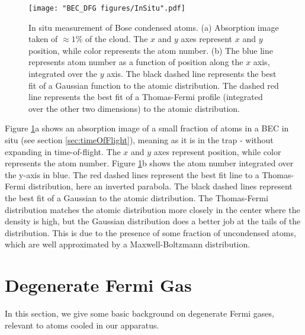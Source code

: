 \begin{figure}
	\texttt{[image: "BEC\_DFG figures/InSitu".pdf]}
\caption[In situ measurement of a fraction of bose condensed atoms]{In situ measurement of Bose condensed atoms. (a) Absorption image taken of $\approx1\%$ of the cloud. The $x$ and $y$ axes represent $x$ and $y$ position, while color represents the atom number. (b) The blue line represents atom number as a function of position along the $x$ axis, integrated over the $y$ axis. The black dashed line represents the best fit of a Gaussian function to the atomic distribution. The dashed red line represents the best fit of a Thomas-Fermi profile (integrated over the other two dimensions) to the atomic distribution.}
\label{fig:InSitu}
\end{figure}

Figure \ref{fig:InSitu}a shows an absorption image of a small fraction of atoms in a BEC in situ (see section \ref{sec:timeOfFlight}), meaning as it is in the trap - without expanding in time-of-flight. The $x$ and $y$ axes represent position, while color represents the atom number. Figure \ref{fig:InSitu}b shows the atom number integrated over the y-axis in blue. The red dashed lines represent the best fit line to a Thomas-Fermi distribution, here an inverted parabola. The black dashed lines represent the best fit of a Gaussian to the atomic distribution. The Thomas-Fermi distribution matches the atomic distribution more closely in the center where the density is high, but the Gaussian distribution does a better job at the tails of the distribution. This is due to the presence of some fraction of uncondensed atoms, which are well approximated by a Maxwell-Boltzmann distribution. 


\section{Degenerate Fermi Gas}\label{sec:DFGintro}
In this section, we give some basic background on degenerate Fermi gases, relevant to \K{} atoms cooled in our apparatus. 

